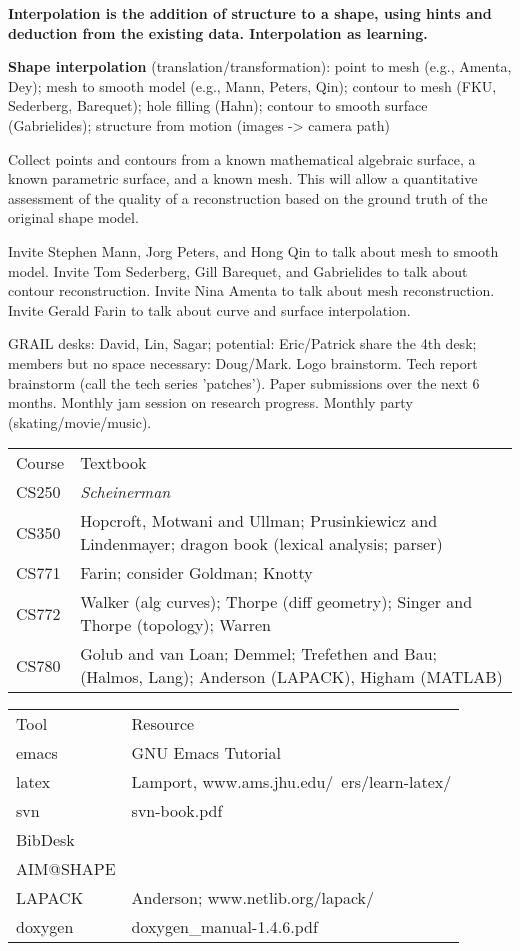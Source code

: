 \documentclass[10pt]{article}
\begin{document}
{\bf Interpolation is the addition of structure to a shape, using hints and deduction from
the existing data.  Interpolation as learning.}

{\bf Shape interpolation} (translation/transformation): 
              point to mesh (e.g., Amenta, Dey); 
              mesh to smooth model (e.g., Mann, Peters, Qin); 
              contour to mesh (FKU, Sederberg, Barequet);
              hole filling (Hahn); 
              contour to smooth surface (Gabrielides);
              structure from motion (images -> camera path)

Collect points and contours from a known mathematical algebraic surface,
a known parametric surface, and a known mesh.
This will allow a quantitative assessment of the quality of a reconstruction
based on the ground truth of the original shape model.

Invite Stephen Mann, Jorg Peters, and Hong Qin to talk about mesh to smooth model.
Invite Tom Sederberg, Gill Barequet, and Gabrielides to talk about contour reconstruction.
Invite Nina Amenta to talk about mesh reconstruction.
Invite Gerald Farin to talk about curve and surface interpolation.

GRAIL desks: David, Lin, Sagar; potential: Eric/Patrick share the 4th desk;
                    members but no space necessary: Doug/Mark.
Logo brainstorm.  
Tech report brainstorm (call the tech series 'patches').  
Paper submissions over the next 6 months.
Monthly jam session on research progress.
Monthly party (skating/movie/music).

\begin{tabular}{ll} \hline
Course & Textbook \\
CS250 & {\em Scheinerman} \\
CS350 & Hopcroft, Motwani and Ullman; Prusinkiewicz and Lindenmayer; 
        dragon book (lexical analysis; parser) \\
CS771 & Farin; consider Goldman; Knotty \\
CS772 & Walker (alg curves); Thorpe (diff geometry); Singer and Thorpe (topology); Warren \\
CS780 & Golub and van Loan; Demmel; Trefethen and Bau; (Halmos, Lang); Anderson (LAPACK), Higham (MATLAB) \\
\hline
\end{tabular}

\begin{tabular}{ll} \hline
Tool & Resource \\
emacs & GNU Emacs Tutorial \\
latex & Lamport, www.ams.jhu.edu/~ers/learn-latex/ \\
svn & svn-book.pdf \\
BibDesk & \\
AIM@SHAPE & \\
LAPACK & Anderson; www.netlib.org/lapack/ \\
doxygen & doxygen\_manual-1.4.6.pdf \\ \hline
\end{tabular}
\end{document}
